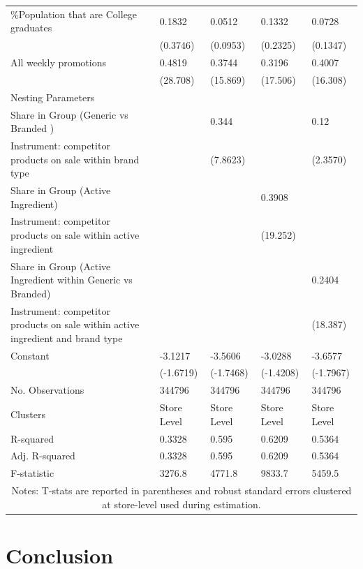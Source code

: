 \documentclass[12pt, authoryear]{elsarticle}
\begin{document}
\begin{table}[H]
{\begin{tabular}{lllll}
			\%Population that are College graduates & 0.1832 & 0.0512 & 0.1332 & 0.0728 \\
			& (0.3746) & (0.0953) & (0.2325) & (0.1347) \\
			All weekly promotions & 0.4819 & 0.3744 & 0.3196 & 0.4007 \\
			& (28.708) & (15.869) & (17.506) & (16.308) \\ \hline
			Nesting Parameters &  &  &  &  \\\hline
			Share in Group (Generic vs Branded ) &  & 0.344 &  & 0.12 \\
		{\color{aurometalsaurus} Instrument: competitor products on sale within brand type}	&  & (7.8623) &  & (2.3570) \\
			Share in Group (Active Ingredient) &  &  & 0.3908 &  \\
	{\color{aurometalsaurus} Instrument: competitor products on sale within active ingredient}	&  &  & (19.252) &  \\
			Share in Group (Active Ingredient within Generic vs Branded) &  &  &  & 0.2404 \\
			{\color{aurometalsaurus} Instrument:  competitor products on sale within active ingredient and brand type}&  &  &  & (18.387) \\ \hline
			Constant & -3.1217 & -3.5606 & -3.0288 & -3.6577 \\
			& (-1.6719) & (-1.7468) & (-1.4208) & (-1.7967) \\\hline
			No. Observations & 344796 & 344796 & 344796 & 344796 \\
			Clusters & Store Level & Store Level & Store Level & Store Level \\
			R-squared & 0.3328 & 0.595 & 0.6209 & 0.5364 \\
			Adj. R-squared & 0.3328 & 0.595 & 0.6209 & 0.5364 \\
			F-statistic & 3276.8 & 4771.8 & 9833.7 & 5459.5 \\ \hline\hline
			\multicolumn{5}{c}{Notes: T-stats are reported in parentheses and robust standard errors clustered at store-level used during estimation.}    
		\end{tabular}%
	}
\end{table}
\pagebreak

\section{Conclusion}\label{conclusion}
\end{document}
